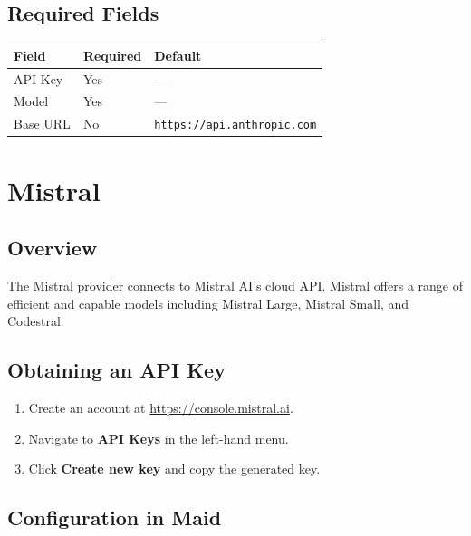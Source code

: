 \documentclass[12pt,a4paper]{article}
\begin{document}
\subsection{Required Fields}

\begin{center}
\begin{tabular}{lll}
\toprule
\textbf{Field} & \textbf{Required} & \textbf{Default} \\
\midrule
API Key  & Yes & — \\
Model    & Yes & — \\
Base URL & No  & \texttt{https://api.anthropic.com} \\
\bottomrule
\end{tabular}
\end{center}

\section{Mistral}

\subsection{Overview}

The Mistral provider connects to Mistral AI's cloud API. Mistral offers a range of efficient and capable models including Mistral Large, Mistral Small, and Codestral.

\subsection{Obtaining an API Key}

\begin{enumerate}
    \item Create an account at \url{https://console.mistral.ai}.
    \item Navigate to \textbf{API Keys} in the left-hand menu.
    \item Click \textbf{Create new key} and copy the generated key.
\end{enumerate}

\subsection{Configuration in Maid}
\end{document}
